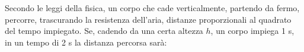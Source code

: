 Secondo le leggi della fisica, un corpo che cade verticalmente, 
partendo da fermo, percorre, trascurando la resistenza dell'aria, 
distanze proporzionali al quadrato del tempo impiegato. 
Se, cadendo da una certa altezza $h$, un corpo impiega 1 s, 
in un tempo di 2 s la distanza percorsa sarà:
